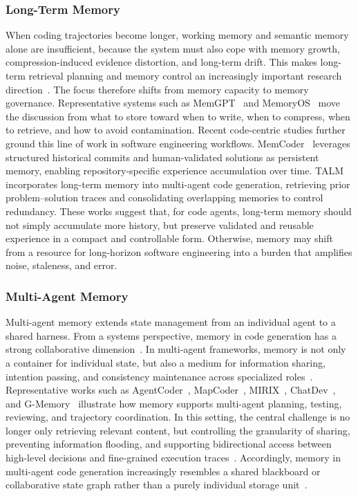 \subsubsection{Long-Term Memory}
When coding trajectories become longer, working memory and semantic memory alone are insufficient, because the system must also cope with memory growth, compression-induced evidence distortion, and long-term drift. This makes long-term retrieval planning and memory control an increasingly important research direction~\cite{maharana2024evaluating,wang2026memex,bei2026mem,zhao2026papermind,ning2026mcsearch}. The focus therefore shifts from memory capacity to memory governance. Representative systems such as MemGPT~\cite{packer2023memgpt} and MemoryOS~\cite{kang2025memory} move the discussion from what to store toward when to write, when to compress, when to retrieve, and how to avoid contamination.
Recent code-centric studies further ground this line of work in software engineering workflows. MemCoder~\cite{deng2026your} leverages structured historical commits and human-validated solutions as persistent memory, enabling repository-specific experience accumulation over time. TALM~\cite{shen2025talm} incorporates long-term memory into multi-agent code generation, retrieving prior problem--solution traces and consolidating overlapping memories to control redundancy. These works suggest that, for code agents, long-term memory should not simply accumulate more history, but preserve validated and reusable experience in a compact and controllable form. Otherwise, memory may shift from a resource for long-horizon software engineering into a burden that amplifies noise, staleness, and error.




\subsubsection{Multi-Agent Memory}
Multi-agent memory extends state management from an individual agent to a shared harness. From a systems perspective, memory in code generation has a strong collaborative dimension~\cite{li2025swe,chen2023gamegpt}. In multi-agent frameworks, memory is not only a container for individual state, but also a medium for information sharing, intention passing, and consistency maintenance across specialized roles~\cite{zhang2025gmemory}. Representative works such as AgentCoder~\cite{huang2023agentcoder}, MapCoder~\cite{islam2024mapcoder}, MIRIX~\cite{wang2025mirix}, ChatDev~\cite{qian2024chatdev}, and G-Memory~\cite{zhang2025gmemory} illustrate how memory supports multi-agent planning, testing, reviewing, and trajectory coordination.
In this setting, the central challenge is no longer only retrieving relevant content, but controlling the granularity of sharing, preventing information flooding, and supporting bidirectional access between high-level decisions and fine-grained execution traces~\cite{chen2023gamegpt}. Accordingly, memory in multi-agent code generation increasingly resembles a shared blackboard or collaborative state graph rather than a purely individual storage unit~\cite{Ishibashi2024SelfOrganized,yuan2025graphs}.


